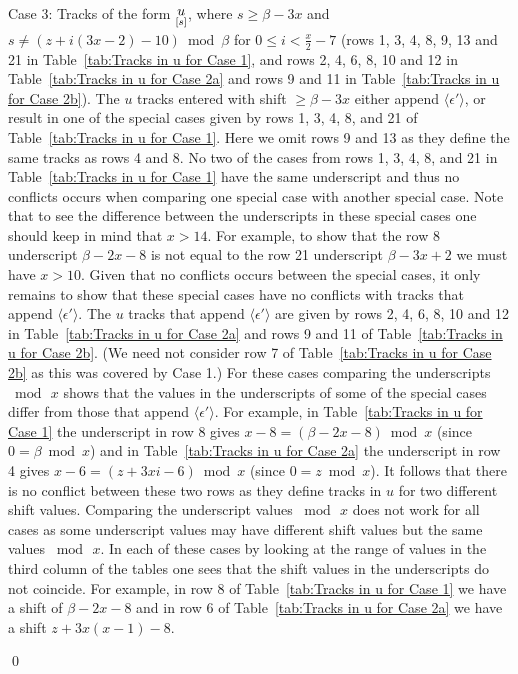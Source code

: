 \documentclass[11pt]{article} \usepackage{amsfonts,amsmath,amssymb,amsthm}
\renewenvironment{proof}{{\bfseries\noindent Proof.}}{\qed\vspace{3.5ex}}
\newcommand{\tne}[1]{\ensuremath{\langle #1\rangle}}
\newcommand{\encodeDeletionPrime}{\tne{\epsilon'}}
\newcommand{\track}[2]{\raisebox{2.5pt}{\ensuremath{\underset{[#1]}#2}}}
\begin{document}
\begin{proof}
Case 3: Tracks of the form $\track{s}{u}$, where $s\geqslant\beta-3x$ and $s\neq (z+i(3x-2)-10)\bmod \beta$ for $0\leqslant i< \frac{x}{2}-7$ (rows 1, 3, 4, 8, 9, 13 and 21 in Table~\ref{tab:Tracks in u for Case 1}, and rows 2, 4, 6, 8, 10 and 12 in Table~\ref{tab:Tracks in u for Case 2a} and rows 9 and 11 in Table~\ref{tab:Tracks in u for Case 2b}). The $u$ tracks entered with shift $\geqslant\beta-3x$  either append $\encodeDeletionPrime$, or result in one of the special cases given by rows 1, 3, 4, 8, and 21 of Table~\ref{tab:Tracks in u for Case 1}. 
Here we omit rows 9 and 13 as they define the same tracks as rows 4 and 8. 
No two of the cases from rows 1, 3, 4, 8, and 21 in Table~\ref{tab:Tracks in u for Case 1} have the same underscript and thus no conflicts occurs when comparing one special case with another special case. 
Note that to see the difference between the underscripts in these special cases one should keep in mind that $x>14$. For example, to show that the row 8 underscript $\beta-2x-8$ is not equal to the row 21 underscript $\beta-3x+2$ we must have $x>10$.
Given that no conflicts occurs between the special cases, it only remains to show that these special cases have no conflicts with tracks that append $\encodeDeletionPrime$. 
The $u$ tracks that append $\encodeDeletionPrime$ are given by rows 2, 4, 6, 8, 10 and 12 in Table~\ref{tab:Tracks in u for Case 2a} and rows 9 and 11 of Table~\ref{tab:Tracks in u for Case 2b}. 
(We need not consider row 7 of Table~\ref{tab:Tracks in u for Case 2b} as this was covered by Case 1.) 
For these cases comparing the underscripts $\bmod\, x$ shows that the values in the underscripts of some of the special cases differ from those that append $\encodeDeletionPrime$. 
For example, in Table~\ref{tab:Tracks in u for Case 1} the underscript in row 8 gives $x-8=(\beta-2x-8)\bmod x$ (since $0=\beta\bmod x$) and in Table~\ref{tab:Tracks in u for Case 2a} the underscript in row 4 gives $x-6=(z+3xi-6)\bmod x$ (since $0=z\bmod x$). 
It follows that there is no conflict between these two rows as they define tracks in $u$ for two different shift values. 
Comparing the underscript values $\bmod\, x$ does not work for all cases as some underscript values may have different shift values but the same values $\bmod\, x$. 
In each of these cases by looking at the range of values in the third column of the tables one sees that the shift values in the underscripts do not coincide. 
For example, in row 8 of Table~\ref{tab:Tracks in u for Case 1} we have a shift of $\beta-2x-8$ and in row 6 of Table~\ref{tab:Tracks in u for Case 2a} we have a shift $z+3x(x-1)-8$. 

\end{proof}
\end{document}

